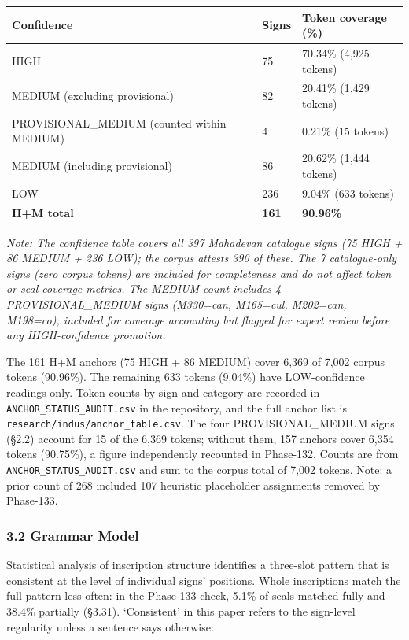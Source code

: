 \documentclass[
]{article}
\newcounter{none} %
\begin{document}
{\def\LTcaptype{none} %
\begin{longtable}[]{@{}lll@{}}
\toprule\noalign{}
Confidence & Signs & Token coverage (\%) \\
\midrule\noalign{}
\endhead
\bottomrule\noalign{}
\endlastfoot
HIGH & 75 & 70.34\% (4,925 tokens) \\ MEDIUM (excluding provisional) & 82 & 20.41\% (1,429 tokens) \\ PROVISIONAL\_MEDIUM (counted within MEDIUM) & 4 & 0.21\% (15 tokens) \\ MEDIUM (including provisional) & 86 & 20.62\% (1,444 tokens) \\ LOW & 236 & 9.04\% (633 tokens) \\ \textbf{H+M total} & \textbf{161} & \textbf{90.96\%} \\
\end{longtable}
}

\textit{Note: The confidence table covers all 397 Mahadevan catalogue signs (75 HIGH + 86 MEDIUM + 236 LOW); the corpus attests 390 of these. The 7 catalogue-only signs (zero corpus tokens) are included for completeness and do not affect token or seal coverage metrics. The MEDIUM count includes 4 PROVISIONAL\_MEDIUM signs (M330=\textit{can}, M165=\textit{cul}, M202=\textit{can}, M198=\textit{co}), included for coverage accounting but flagged for expert review before any HIGH-confidence promotion.}

The 161 H+M anchors (75 HIGH + 86 MEDIUM) cover 6,369 of 7,002 corpus tokens (90.96\%). The remaining 633 tokens (9.04\%) have LOW-confidence readings only. Token counts by sign and category are recorded in \texttt{ANCHOR\_STATUS\_AUDIT.csv} in the repository, and the full anchor list is \texttt{research/\allowbreak indus/\allowbreak anchor\_table.csv}. The four PROVISIONAL\_MEDIUM signs (§2.2) account for 15 of the 6,369 tokens; without them, 157 anchors cover 6,354 tokens (90.75\%), a figure independently recounted in Phase-132. Counts are from \texttt{ANCHOR\_STATUS\_AUDIT.csv} and sum to the corpus total of 7,002 tokens. Note: a prior count of 268 included 107 heuristic placeholder assignments removed by Phase-133.

\subsubsection{3.2 Grammar Model}\label{grammar-model}

Statistical analysis of inscription structure identifies a three-slot pattern that is consistent at the level of individual signs' positions. Whole inscriptions match the full pattern less often: in the Phase-133 check, 5.1\% of seals matched fully and 38.4\% partially (§3.31). `Consistent' in this paper refers to the sign-level regularity unless a sentence says otherwise:
\end{document}
